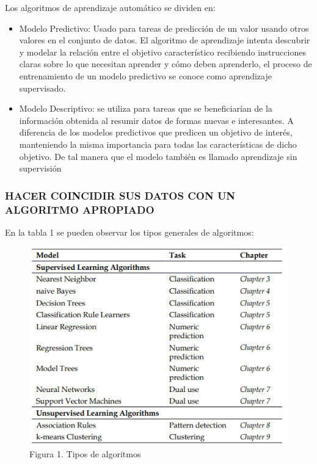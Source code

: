 \documentclass[
  letterpaper,
  DIV=11,
  numbers=noendperiod]{scrartcl}
\begin{document}
Los algoritmos de aprendizaje automático se dividen en:

\begin{itemize}
\item
  Modelo Predictivo: Usado para tareas de predicción de un valor usando
  otros valores en el conjunto de datos. El algoritmo de aprendizaje
  intenta descubrir y modelar la relación entre el objetivo
  característico recibiendo instrucciones claras sobre lo que necesitan
  aprender y cómo deben aprenderlo, el proceso de entrenamiento de un
  modelo predictivo se conoce como aprendizaje supervisado.
\item
  Modelo Descriptivo: se utiliza para tareas que se beneficiarían de la
  información obtenida al resumir datos de formas nuevas e interesantes.
  A diferencia de los modelos predictivos que predicen un objetivo de
  interés, manteniendo la misma importancia para todas las
  características de dicho objetivo. De tal manera que el modelo también
  es llamado aprendizaje sin supervisión
\end{itemize}

\hypertarget{hacer-coincidir-sus-datos-con-un-algoritmo-apropiado}{%
\subsubsection{HACER COINCIDIR SUS DATOS CON UN ALGORITMO
APROPIADO}\label{hacer-coincidir-sus-datos-con-un-algoritmo-apropiado}}

En la tabla 1 se pueden observar los tipos generales de algoritmos:

\begin{figure}

{\centering \includegraphics{Tipos de algoritmos.png}

}

\caption{Figura 1. Tipos de algoritmos}

\end{figure}
\end{document}
